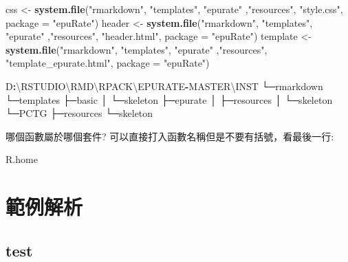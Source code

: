 \documentclass[]{book}
\newenvironment{Shaded}{\begin{snugshade}}{\end{snugshade}}
\newcommand{\DataTypeTok}[1]{\textcolor[rgb]{0.13,0.29,0.53}{#1}}
\newcommand{\KeywordTok}[1]{\textcolor[rgb]{0.13,0.29,0.53}{\textbf{#1}}}
\newcommand{\NormalTok}[1]{#1}
\newcommand{\OperatorTok}[1]{\textcolor[rgb]{0.81,0.36,0.00}{\textbf{#1}}}
\newcommand{\StringTok}[1]{\textcolor[rgb]{0.31,0.60,0.02}{#1}}
\theoremstyle{definition}
\theoremstyle{definition}
\theoremstyle{definition}
\theoremstyle{remark}
\begin{document}
\begin{Shaded}
\begin{Highlighting}[]
\NormalTok{  css <-}\StringTok{ }\KeywordTok{system.file}\NormalTok{(}\StringTok{"rmarkdown"}\NormalTok{, }\StringTok{"templates"}\NormalTok{, }\StringTok{"epurate"}\NormalTok{ ,}\StringTok{"resources"}\NormalTok{, }\StringTok{"style.css"}\NormalTok{, }\DataTypeTok{package =} \StringTok{"epuRate"}\NormalTok{)}
\NormalTok{  header <-}\StringTok{ }\KeywordTok{system.file}\NormalTok{(}\StringTok{"rmarkdown"}\NormalTok{, }\StringTok{"templates"}\NormalTok{, }\StringTok{"epurate"}\NormalTok{ ,}\StringTok{"resources"}\NormalTok{, }\StringTok{"header.html"}\NormalTok{, }\DataTypeTok{package =} \StringTok{"epuRate"}\NormalTok{)}
\NormalTok{  template <-}\StringTok{ }\KeywordTok{system.file}\NormalTok{(}\StringTok{"rmarkdown"}\NormalTok{, }\StringTok{"templates"}\NormalTok{, }\StringTok{"epurate"}\NormalTok{ ,}\StringTok{"resources"}\NormalTok{, }\StringTok{"template_epurate.html"}\NormalTok{, }\DataTypeTok{package =} \StringTok{"epuRate"}\NormalTok{)}
  
\NormalTok{D}\OperatorTok{:}\NormalTok{\textbackslash{}RSTUDIO\textbackslash{}RMD\textbackslash{}RPACK\textbackslash{}EPURATE}\OperatorTok{-}\NormalTok{MASTER\textbackslash{}INST}
\NormalTok{└─rmarkdown}
\NormalTok{    └─templates}
\NormalTok{        ├─basic}
\NormalTok{        │  └─skeleton}
\NormalTok{        ├─epurate}
\NormalTok{        │  ├─resources}
\NormalTok{        │  └─skeleton}
\NormalTok{        └─PCTG}
\NormalTok{            ├─resources}
\NormalTok{            └─skeleton}
  
  
\end{Highlighting}
\end{Shaded}

哪個函數屬於哪個套件? 可以直接打入函數名稱但是不要有括號，看最後一行:

\begin{Shaded}
\begin{Highlighting}[]
\NormalTok{R.home}
\end{Highlighting}
\end{Shaded}

\section{範例解析}

\hypertarget{test}{%
\subsection{test}\label{test}}
\end{document}
